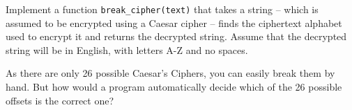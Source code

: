 \documentclass{article}
\begin{document}
Implement a function \texttt{break\_cipher(text)} that takes a string
-- which is assumed to be encrypted using a Caesar cipher -- finds the
ciphertext alphabet used to encrypt it and returns the decrypted
string. Assume that the decrypted string will be in English, with
letters A-Z and no spaces.

As there are only 26 possible Caesar's Ciphers, you can easily break
them by hand.  But how would a program automatically decide which of the 26 possible
offsets is the correct one?
\end{document}
